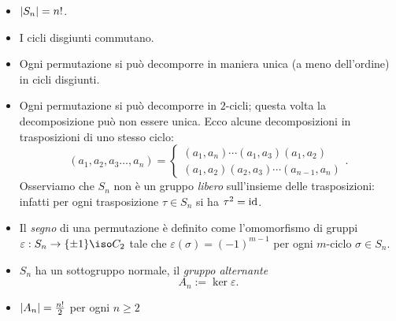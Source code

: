 \begin{itemize}
\item $\left\lvert S_n\right\rvert=n!$.
\item I cicli disgiunti commutano.
\item Ogni permutazione si può decomporre in maniera unica (a meno dell'ordine) in cicli disgiunti.
\item Ogni permutazione si può decomporre in $2$-cicli; questa volta la decomposizione può non essere unica. Ecco alcune decomposizioni in trasposizioni di uno stesso ciclo:
\[(a_1, a_2, a_3 \dots{}, a_n) = \begin{cases} (a_1, a_n) \cdots{} (a_1, a_3) (a_1, a_2) \\ (a_1, a_2) (a_2, a_3) \cdots (a_{n-1}, a_n) \end{cases}.\]
Osserviamo che $S_n$ non è un gruppo {\em libero} sull'insieme delle trasposizioni: infatti per ogni trasposizione $\tau \in S_n$ si ha $\tau^2 = \mathrm{id}$. %
\item Il {\em segno} di una permutazione è definito come l'omomorfismo di gruppi $\varepsilon : S_n \to \{\pm 1\} \iso C_2$ tale che $\varepsilon(\sigma)=(-1)^{m-1}$ per ogni $m$-ciclo $\sigma \in S_n$.
\item $S_n$ ha un sottogruppo normale, il {\em gruppo alternante}
\[A_n := \ker \varepsilon .\]
\item $\left\lvert A_n\right\rvert=\frac{n!}{2}$ per ogni $n\ge2$
\end{itemize}

